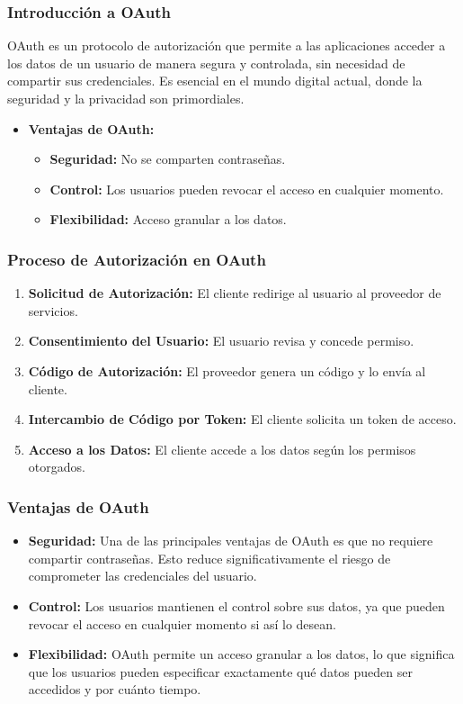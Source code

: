 \subsubsection{Introducción a OAuth}

OAuth es un protocolo de autorización que permite a las aplicaciones acceder a los datos de un usuario de manera segura y controlada, sin necesidad de compartir sus credenciales. Es esencial en el mundo digital actual, donde la seguridad y la privacidad son primordiales.

\begin{itemize}
    \item \textbf{Ventajas de OAuth:}
    \begin{itemize}
        \item \textbf{Seguridad:} No se comparten contraseñas.
        \item \textbf{Control:} Los usuarios pueden revocar el acceso en cualquier momento.
        \item \textbf{Flexibilidad:} Acceso granular a los datos.
    \end{itemize}
\end{itemize}

\subsubsection{Proceso de Autorización en OAuth}

\begin{enumerate}
    \item \textbf{Solicitud de Autorización:} El cliente redirige al usuario al proveedor de servicios.
    \item \textbf{Consentimiento del Usuario:} El usuario revisa y concede permiso.
    \item \textbf{Código de Autorización:} El proveedor genera un código y lo envía al cliente.
    \item \textbf{Intercambio de Código por Token:} El cliente solicita un token de acceso.
    \item \textbf{Acceso a los Datos:} El cliente accede a los datos según los permisos otorgados.
\end{enumerate}

\subsubsection{Ventajas de OAuth}

\begin{itemize}
    \item \textbf{Seguridad:} Una de las principales ventajas de OAuth es que no requiere compartir contraseñas. Esto reduce significativamente el riesgo de comprometer las credenciales del usuario.
    \item \textbf{Control:} Los usuarios mantienen el control sobre sus datos, ya que pueden revocar el acceso en cualquier momento si así lo desean.
    \item \textbf{Flexibilidad:} OAuth permite un acceso granular a los datos, lo que significa que los usuarios pueden especificar exactamente qué datos pueden ser accedidos y por cuánto tiempo.
\end{itemize}

